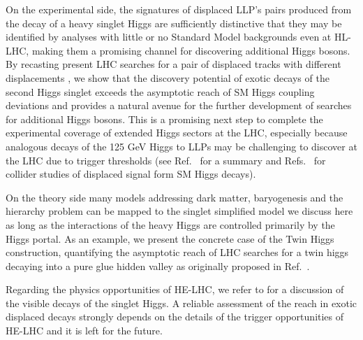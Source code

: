 On the experimental side, the signatures of displaced LLP's pairs produced from the decay of a heavy singlet Higgs are sufficiently distinctive that they may be identified by analyses with little or no Standard Model backgrounds even at HL-LHC, making them a promising channel for discovering additional Higgs bosons. By recasting present LHC searches for a pair of displaced tracks with different displacements \cite{Aad:2015uaa,CMS:2014wda,Aaboud:2018aqj,Sirunyan:2018pwn}, we show that the discovery potential of exotic decays of the second Higgs singlet exceeds the asymptotic reach of SM Higgs coupling deviations and provides a natural avenue for the further development of searches for additional Higgs bosons. This is a promising next step to complete the experimental coverage of extended Higgs sectors at the LHC, especially because analogous decays of the 125 GeV Higgs to LLPs may be challenging to discover at the LHC due to trigger thresholds (see Ref.~\cite{Curtin:2013fra} for a summary and Refs.~\cite{Clarke:2015ala,Csaki:2015fba,Curtin:2015fna,Pierce:2017taw} for collider studies of displaced signal form SM Higgs decays).
  
On the theory side many models addressing dark matter, baryogenesis and the hierarchy problem can be mapped to the singlet simplified model we discuss here as long as the interactions of the heavy Higgs are controlled primarily by the Higgs portal. As an example, we present the concrete case of the Twin Higgs construction, quantifying the asymptotic reach of LHC searches for a twin higgs decaying into a pure glue hidden valley as originally proposed in Ref.~\cite{Craig:2015pha}. 

Regarding the physics opportunities of HE-LHC, we refer to \cite{CidVidal:2018eel} for a discussion of the visible decays of the singlet Higgs. A reliable assessment of the reach in exotic displaced decays strongly depends on the details of the trigger opportunities of HE-LHC and it is left for the future.    


